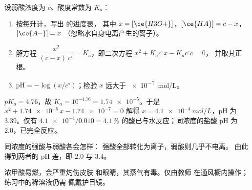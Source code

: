\begin{method}[弱酸的 pH]\label{met:g12:ka-and-pka:weak}
设弱酸浓度为 $c$、酸度常数为 $K_a$：
\begin{enumerate}
  \item 按每升计，写出  的进度表，
        其中 $x = [\ce{H3O+}]$，$[\ce{HA}] = c - x$，$[\ce{A-}] = x$
        （忽略水自身电离产生的离子）。
  \item 解方程 $\dfrac{x^2}{(c - x)\,c^\circ} = K_a$，即二次方程
        $x^2 + K_a c^\circ x - K_a c^\circ c = 0$，
        并取其正根。
  \item $\mathrm{pH} = -\log(x/c^\circ)$；检验 $x$ 远大于
        \qty{e-7}{mol/L}。
\end{enumerate}
\end{method}

\begin{example}\label{ex:g12:ka-and-pka:acetic}
$pK_a = 4.76$，故 $K_a = 10^{-4.76} = \num{1.74e-5}$。于是
$x^2 + \num{1.74e-5}\,x - \num{1.74e-7} = 0$ 解得
$x = \qty{4.1e-4}{mol/L}$，pH 为 3.39。仅有 $\num{4.1e-4}/0.010 =
\qty{4.1}{\percent}$ 的酸已与水反应；同浓度的盐酸
pH 为 2.0，已完全反应。
\end{example}

\begin{omfigure}

{\small 同浓度的强酸与弱酸各会怎样：
强酸全部转化为离子，弱酸则几乎不电离。
由此得到两者的 pH 差，即 2.0 与 3.4。}
\end{omfigure}

\begin{safety}{}
浓甲酸易燃，会严重灼伤皮肤
和眼睛，其蒸气有毒。仅由教师
在通风橱内操作；练习中的稀溶液仍需
佩戴护目镜。
\end{safety}

